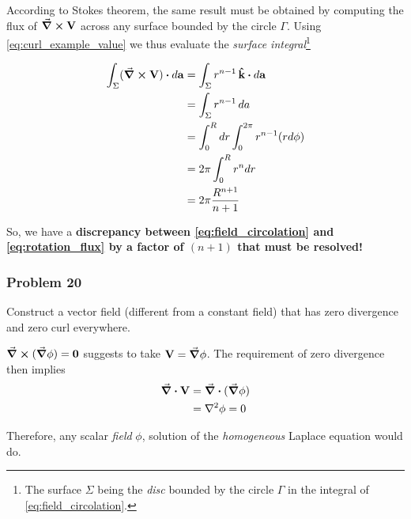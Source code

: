 According to Stokes theorem, the same result must be obtained by computing the flux of $\curl{\vb{V}}$ across any surface bounded by the circle $\Gamma$. Using \ref{eq:curl_example_value} we thus evaluate the \textit{surface integral}\footnote{The surface $\Sigma$ being the \textit{disc} bounded by the circle $\Gamma$ in the integral of \ref{eq:field_circolation}.}

\begin{equation}
\begin{aligned}
\int_{\Sigma} (\curl{\vb{V}}) \vdot d\vb{a} 
	&= \int_{\Sigma} r^{n-1}\, \vu{k} \vdot d\vb{a} \\
	&= \int_{\Sigma} r^{n-1}\, d a \\
	&= \int_0^R dr \int_0^{2 \pi}  r^{n-1} (r d\phi) \\
	&= 2\pi \int_0^R r^n dr \\
	&= 2\pi \frac{R^{n+1}}{n+1}
\end{aligned}
\label{eq:rotation_flux}
\end{equation}

So, we have a \textbf{discrepancy between \ref{eq:field_circolation} and \ref{eq:rotation_flux} by a factor of $(n+1)$ that must be resolved!}

\subsubsection*{Problem 20}
Construct a vector field (different from a constant field) that has zero divergence and zero curl everywhere.

$\curl{(\grad{\phi})} = \vb{0}$ suggests to take $\vb{V} = \grad{\phi}$. The requirement of zero divergence then implies 
\begin{equation*}
\begin{aligned}
\div{\vb{V}} &= \div{(\grad{\phi})} \\
             &= \laplacian{\phi} = 0 
\end{aligned}
\end{equation*}

Therefore, any scalar \textit{field} $\phi$, solution of the \textit{homogeneous} Laplace equation would do. 

